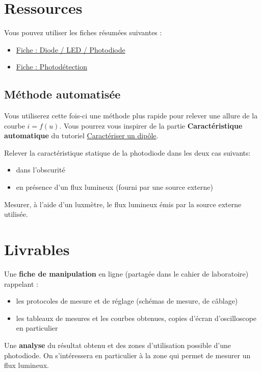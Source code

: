 \section{Ressources}

Vous pouvez utiliser les fiches résumées suivantes : 

\begin{itemize}
	\item \hyperref[fiche:Led]{Fiche : Diode / LED / Photodiode}
	\item \hyperref[fiche:Photodetect]{Fiche : Photodétection}
\end{itemize}


\subsection{Méthode automatisée}

Vous utiliserez cette fois-ci une méthode plus rapide pour relever une allure de la courbe $i = f(u)$. Vous pourrez vous inspirer de la partie \textbf{Caractéristique automatique} du tutoriel \hyperref[ressource:CaracStat]{Caractériser un dipôle}.

\Manip Relever la caractéristique statique de la photodiode dans les deux cas suivants:

\begin{itemize}
	\item dans l'obscurité
	\item en présence d'un flux lumineux (fourni par une source externe)
\end{itemize}

\Manip Mesurer, à l'aide d'un luxmètre, le flux lumineux émis par la source externe utilisée.



\section{Livrables}


Une \textbf{fiche de manipulation} en ligne (partagée dans le cahier de laboratoire) rappelant :

\begin{itemize}
	\item les protocoles de mesure et de réglage (schémas de mesure, de câblage)
	\item les tableaux de mesures et les courbes obtenues, %
	copies d'écran d'oscilloscope en particulier %
\end{itemize}

Une \textbf{analyse} du résultat obtenu et des zones d'utilisation possible d'une photodiode. On s'intéressera en particulier à la zone qui permet de mesurer un flux lumineux.

